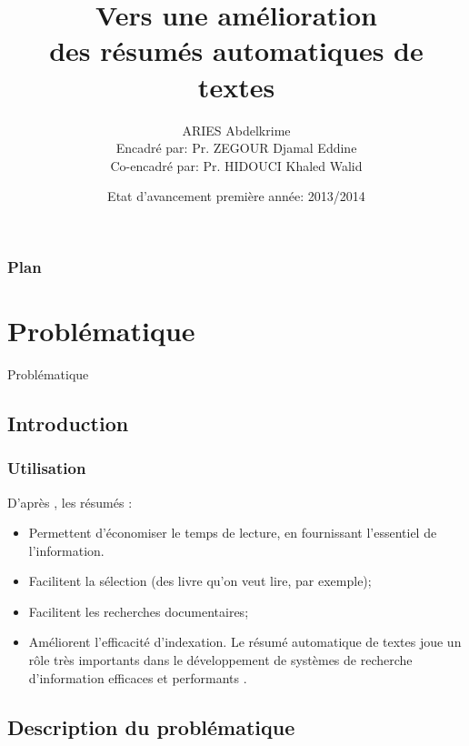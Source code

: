 \documentclass{beamer}
\title[Vers une amélioration \\des résumés automatiques de textes \hspace*{2cm}  \textbf{\footnotesize  \insertframenumber/\inserttotalframenumber} ] %
{Vers une amélioration \\des résumés automatiques de textes} %
\institute{ %
École  nationale Supérieure d'Informatique (ESI, ex. INI), Algérie  %
}
\author[ARIES Abdelkrime (ESI 2014)] %
{ARIES Abdelkrime \\ {\footnotesize %
Encadré par: Pr. ZEGOUR Djamal Eddine\\%
Co-encadré par: Pr. HIDOUCI Khaled Walid}}
\date{Etat d'avancement première année: 2013/2014} %
\begin{document}

\begin{frame}[plain]
\maketitle
\end{frame}


\begin{frame}
\frametitle{Plan}
{\footnotesize \tableofcontents[hideothersubsections]}
\end{frame}

\section{Problématique}
\begin{frame}
\begin{center}
{\Huge Problématique}
\end{center}
\end{frame}

\subsection{Introduction}

\begin{frame}
\frametitle{Utilisation}

D’après \cite{75-borko-bernier}, les résumés :
\begin{itemize}
\item Permettent d'économiser le temps de lecture, en fournissant l’essentiel de
l’information.
\item Facilitent la sélection (des livre qu’on veut lire, par exemple);
\item Facilitent les recherches documentaires;
\item Améliorent l'efficacité d'indexation. 
Le résumé automatique de textes joue un rôle très importants dans le développement de systèmes de recherche d'information efficaces et performants \cite{03-allan-al}.
\end{itemize}

\end{frame}

\subsection{Description du problématique}
\end{document}
